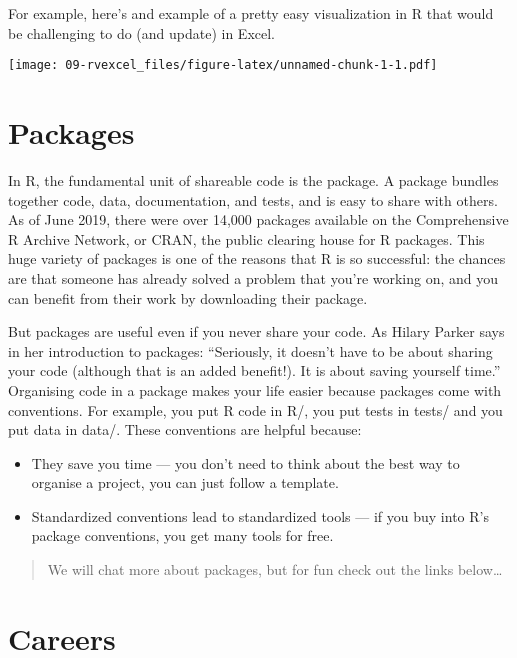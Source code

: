 \documentclass[
]{book}
\providecommand{\tightlist}{%
  \setlength{\itemsep}{0pt}\setlength{\parskip}{0pt}}
\begin{document}
For example, here's and example of a pretty easy visualization in R that would be challenging to do (and update) in Excel.

\texttt{[image: 09-rvexcel\_files/figure-latex/unnamed-chunk-1-1.pdf]}

\hypertarget{packages}{%
\section{Packages}\label{packages}}

In R, the fundamental unit of shareable code is the package. A package bundles together code, data, documentation, and tests, and is easy to share with others. As of June 2019, there were over 14,000 packages available on the Comprehensive R Archive Network, or CRAN, the public clearing house for R packages. This huge variety of packages is one of the reasons that R is so successful: the chances are that someone has already solved a problem that you're working on, and you can benefit from their work by downloading their package.

But packages are useful even if you never share your code. As Hilary Parker says in her introduction to packages: ``Seriously, it doesn't have to be about sharing your code (although that is an added benefit!). It is about saving yourself time.'' Organising code in a package makes your life easier because packages come with conventions. For example, you put R code in R/, you put tests in tests/ and you put data in data/. These conventions are helpful because:

\begin{itemize}
\tightlist
\item
  They save you time --- you don't need to think about the best way to organise a project, you can just follow a template.
\item
  Standardized conventions lead to standardized tools --- if you buy into R's package conventions, you get many tools for free.
\end{itemize}

\begin{quote}
We will chat more about packages, but for fun check out the links below\ldots{}
\end{quote}

\hypertarget{careers}{%
\section{Careers}\label{careers}}
\end{document}

